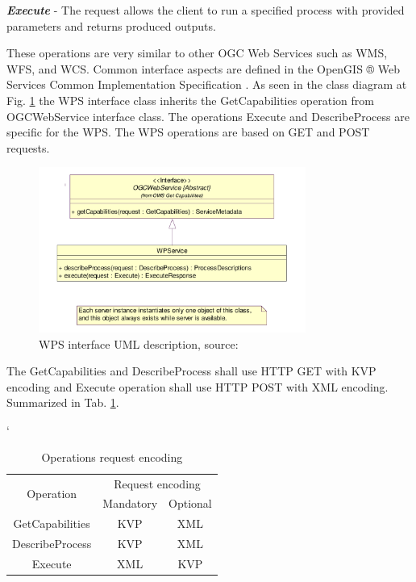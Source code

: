 \textbf{\textit{Execute}} - The request allows the client to run a specified process with provided parameters and returns
produced outputs.

\newpage
These operations are very similar to other OGC Web Services such as WMS, WFS, and WCS. Common interface aspects
are defined in the OpenGIS ® Web Services Common Implementation Specification \cite{OGC_common}. As seen in 
the class diagram at \\
Fig. \ref{fig:WPS_class_diagram} the WPS interface class inherits the GetCapabilities operation 
from OGCWebService interface class. The operations Execute and DescribeProcess are specific for the WPS. The WPS
operations are based on GET and POST requests.

\begin{figure}[h!]
\centering
\includegraphics[width=0.78\textwidth]{img/WPS_class_diagram.png}
\caption{WPS interface UML description, source: \cite{WPS_standart_1.0}}
\label{fig:WPS_class_diagram}
\end{figure}

The GetCapabilities and DescribeProcess shall use HTTP GET with KVP encoding and Execute operation shall use HTTP
POST with XML encoding. Summarized in Tab. \ref{tab:WPS_encoding}.
\begin{table}[h!]
\catcode`
\centering
\begin{tabular}{|c|c|c|}
\hline
\multirow{2}{*}{Operation} & \multicolumn{2}{c|}{Request encoding} \\ \cline{2-3} 
                           & Mandatory          & Optional         \\ \hhline{|=|=|=|}
GetCapabilities            & KVP                & XML              \\ \hline
DescribeProcess            & KVP                & XML              \\ \hline
Execute                    & XML                & KVP              \\ \hline
\end{tabular}
\caption{Operations request encoding}
\label{tab:WPS_encoding}
\end{table}


